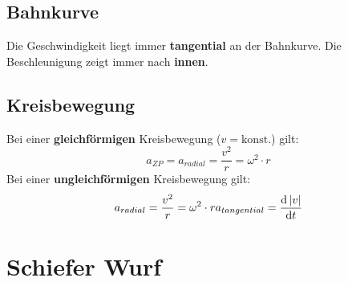 \begin{footnotesize}
\end{footnotesize}
\newline


\subsection{Bahnkurve}

Die Geschwindigkeit liegt immer \textbf{tangential} an der Bahnkurve. \newline
\newline
Die Beschleunigung zeigt immer nach \textbf{innen}.

\subsection{Kreisbewegung}
Bei einer \textbf{gleichförmigen} Kreisbewegung ($v=\mathrm{konst.}$) gilt:
\[
	a_{ZP}=a_{radial}=\frac{v^2}{r}=\omega^2 \cdot r
\]
\newline
\newline
Bei einer \textbf{ungleichförmigen} Kreisbewegung gilt:
\[
	a_{radial}=\frac{v^2}{r}=\omega^2 \cdot r \\
	a_{tangential}=\frac{\mathrm{d}\left|v\right|}{\mathrm{d}t}
\]

\section{Schiefer Wurf}


